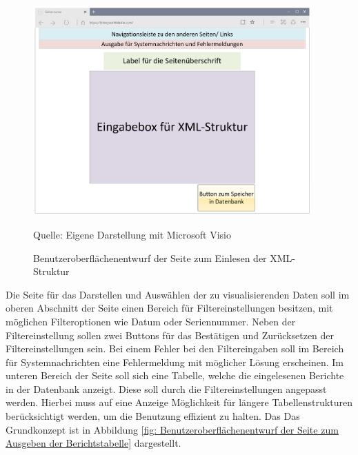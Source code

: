 \begin{figure}[H]
    \centering
    \includegraphics[width=0.95\textwidth]{Grafiken/Overlay_Einleseseite}
    \caption{Benutzeroberflächenentwurf der Seite zum Einlesen der XML-Struktur}
    \label{fig: Benutzeroberflächenentwurf der Seite zum Einlesen der XML-Struktur}
    {Quelle: Eigene Darstellung mit Microsoft Visio}
\end{figure}

Die Seite für das Darstellen und Auswählen der zu visualisierenden Daten soll im oberen Abschnitt der Seite
einen Bereich für Filtereinstellungen besitzen, mit möglichen Filteroptionen wie Datum oder Seriennummer.
Neben der Filtereinstellung sollen zwei Buttons für das Bestätigen und Zurücksetzen der Filtereinstellungen
sein. Bei einem Fehler bei den Filtereingaben soll im Bereich für Systemnachrichten eine Fehlermeldung
mit möglicher Lösung erscheinen.
Im unteren Bereich der Seite soll sich eine Tabelle, welche die eingelesenen Berichte in der Datenbank
anzeigt. Diese soll durch die Filtereinstellungen angepasst werden. Hierbei muss auf eine Anzeige
Möglichkeit für längere Tabellenstrukturen berücksichtigt werden, um die Benutzung effizient zu halten. Das
Das Grundkonzept ist in Abbildung \ref{fig: Benutzeroberflächenentwurf der Seite zum Ausgeben der Berichtstabelle} dargestellt.

